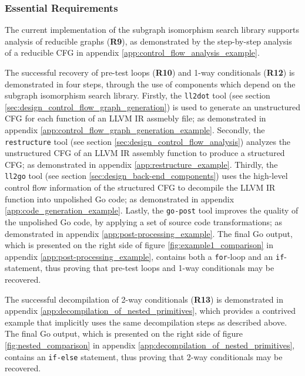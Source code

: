 
\subsubsection{Essential Requirements}
\label{sec:eval_control_flow_analysis_library_essential_requirements}


The current implementation of the subgraph isomorphism search library supports analysis of reducible graphs (\textbf{R9}), as demonstrated by the step-by-step analysis of a reducible CFG in appendix \ref{app:control_flow_analysis_example}.


The successful recovery of pre-test loops (\textbf{R10}) and 1-way conditionals (\textbf{R12}) is demonstrated in four steps, through the use of components which depend on the subgraph isomorphism search library. Firstly, the \texttt{ll2dot} tool (see section \ref{sec:design_control_flow_graph_generation}) is used to generate an unstructured CFG for each function of an LLVM IR assmebly file; as demonstrated in appendix \ref{app:control_flow_graph_generation_example}. Secondly, the \texttt{restructure} tool (see section \ref{sec:design_control_flow_analysis}) analyzes the unstructured CFG of an LLVM IR assembly function to produce a structured CFG; as demonstrated in appendix \ref{app:restructure_example}. Thirdly, the \texttt{ll2go} tool (see section \ref{sec:design_back-end_components}) uses the high-level control flow information of the structured CFG to decompile the LLVM IR function into unpolished Go code; as demonstrated in appendix \ref{app:code_generation_example}. Lastly, the \texttt{go-post} tool improves the quality of the unpolished Go code, by applying a set of source code transformations; as demonstrated in appendix \ref{app:post-processing_example}. The final Go output, which is presented on the right side of figure \ref{fig:example1_comparison} in appendix \ref{app:post-processing_example}, contains both a \texttt{for}-loop and an \texttt{if}-statement, thus proving that pre-test loops and 1-way conditionals may be recovered.


The successful decompilation of 2-way conditionals (\textbf{R13}) is demonstrated in appendix \ref{app:decompilation_of_nested_primitives}, which provides a contrived example that implicitly uses the same decompilation steps as described above. The final Go output, which is presented on the right side of figure \ref{fig:nested_comparison} in appendix \ref{app:decompilation_of_nested_primitives}, contains an \texttt{if-else} statement, thus proving that 2-way conditionals may be recovered.

